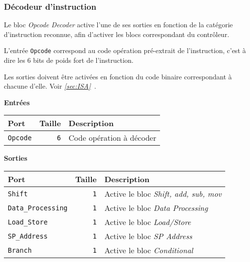 \subsubsection{Décodeur d'instruction}


Le bloc \textit{Opcode Decoder} active l'une de ses sorties en fonction de la catégorie d'instruction reconnue, afin d'activer les blocs correspondant du contrôleur.

L'entrée \texttt{Opcode} correspond au code opération pré-extrait de l'instruction, c'est à dire les 6 bits de poids fort de l'instruction.

Les sorties doivent être activées en fonction du code binaire correspondant à chacune d'elle. Voir \textit{\ref{sec:ISA}~}.


\textbf{Entrées}\\

\begin{tabular}{|l|r|l|}
\hline
\textbf{Port}	& \textbf{Taille} & \textbf{Description}\\
\hline

\texttt{Opcode}	& \texttt{6} & Code opération à décoder\\

\hline
\end{tabular}

\vspace{1em}
\textbf{Sorties}\\

\begin{tabular}{|l|r|l|}
\hline 
\textbf{Port} & \textbf{Taille} & \textbf{Description}\\
\hline

\texttt{Shift}			&  \texttt{1} & Active le bloc \textit{Shift, add, sub, mov}\\
\hline
\texttt{Data\_Processing}	&  \texttt{1} & Active le bloc \textit{Data Processing}\\
\hline
\texttt{Load\_Store}		&  \texttt{1} & Active le bloc \textit{Load/Store}\\
\hline
\texttt{SP\_Address}		&  \texttt{1} & Active le bloc \textit{SP Address}\\
\hline
\texttt{Branch}			&  \texttt{1} & Active le bloc \textit{Conditional}\\

\hline
\end{tabular}





